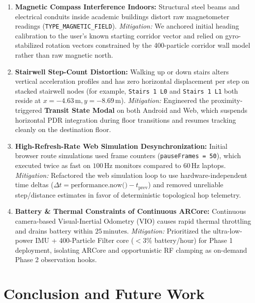 \documentclass[11pt,a4paper]{article}
\begin{document}
\begin{enumerate}
    \item \textbf{Magnetic Compass Interference Indoors:} Structural steel beams and electrical conduits inside academic buildings distort raw magnetometer readings (\texttt{TYPE\_MAGNETIC\_FIELD}). \textit{Mitigation:} We anchored initial heading calibration to the user's known starting corridor vector and relied on gyro-stabilized rotation vectors constrained by the 400-particle corridor wall model rather than raw magnetic north.
    \item \textbf{Stairwell Step-Count Distortion:} Walking up or down stairs alters vertical acceleration profiles and has zero horizontal displacement per step on stacked stairwell nodes (for example, \texttt{Stairs 1 L0} and \texttt{Stairs 1 L1} both reside at $x=-4.63\,\text{m}, y=-8.69\,\text{m}$). \textit{Mitigation:} Engineered the proximity-triggered \textbf{Transit State Modal} on both Android and Web, which suspends horizontal PDR integration during floor transitions and resumes tracking cleanly on the destination floor.
    \item \textbf{High-Refresh-Rate Web Simulation Desynchronization:} Initial browser route simulations used frame counters (\texttt{pauseFrames = 50}), which executed twice as fast on $100\,\text{Hz}$ monitors compared to $60\,\text{Hz}$ laptops. \textit{Mitigation:} Refactored the web simulation loop to use hardware-independent time deltas ($\Delta t = \text{performance.now()} - t_{\text{prev}}$) and removed unreliable step/distance estimates in favor of deterministic topological hop telemetry.
    \item \textbf{Battery \& Thermal Constraints of Continuous ARCore:} Continuous camera-based Visual-Inertial Odometry (VIO) causes rapid thermal throttling and drains battery within $25\,\text{minutes}$. \textit{Mitigation:} Prioritized the ultra-low-power IMU + 400-Particle Filter core ($<3\%$ battery/hour) for Phase 1 deployment, isolating ARCore and opportunistic RF clamping as on-demand Phase 2 observation hooks.
\end{enumerate}

\section{Conclusion and Future Work}
\end{document}
